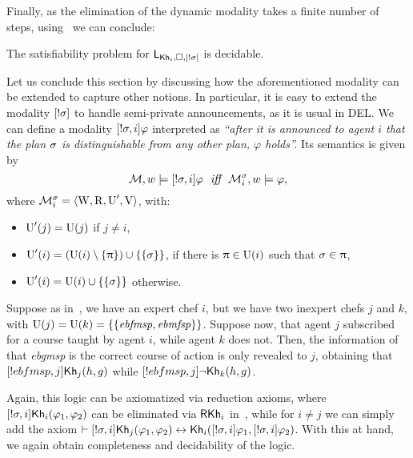 Finally, as the elimination of the dynamic modality takes a finite number of steps, using~ we can conclude:

\medskip 

\begin{corollary}
The satisfiability problem for $\mathsf{L}_{{\sf Kh}_i,\square,[!\sigma]}$ is decidable.
\end{corollary} 

\medskip 

Let us conclude this section by discussing how the aforementioned modality can be extended to capture other notions. In particular, it is easy to extend the modality $[!\sigma]$ to handle semi-private announcements, as it is usual in DEL. We can define a modality  $[!\sigma,i]\varphi$ interpreted as \emph{``after it is announced to agent $i$ that the plan $\sigma$ is distinguishable from any other plan, $\varphi$ holds''.} Its semantics is given by 
\[
    \modults,w \models \srefbox{\plan,i}\varphi \ \ \iff \ \ \modults^\plan_i,w \models \varphi,
\]
where $\mathcal{M}^\sigma_i = \langle \operatorname{W},\operatorname{R},\operatorname{U}',\operatorname{V} \rangle$, with:
\begin{itemize}
\item $\operatorname{U}'(j) = \operatorname{U}(j)$ if $j \neq i$,
\item $\operatorname{U}'(i) = (\operatorname{U}(i) \setminus \{ \uppi \}) \cup \{ \{ \sigma \} \}$, if there is $\uppi \in \operatorname{U}(i)$ such that $\sigma \in \uppi$,
\item $\operatorname{U}'(i) = \operatorname{U}(i) \cup \{ \{ \sigma \} \}$ otherwise.
\end{itemize}   

\medskip 

\begin{example}
Suppose as in~, we have an expert chef $i$, but we have two inexpert chefs $j$ and $k$, with $\operatorname{U}(j)=\operatorname{U}(k)=\{ \{ \mathit{ebfmsp},\mathit{ebmfsp} \} \}$. Suppose now, that agent $j$ subscribed for a course taught by agent $i$, while agent $k$ does not. Then, the information of that \textit{ebgmsp} is the correct course of action is only revealed to $j$, obtaining that $[!ebfmsp,j]{\sf Kh}_j(h,g)$ while $[!ebfmsp,j]\neg{\sf Kh}_k(h,g)$.
\end{example}

Again, this logic can be axiomatized via reduction axioms, where $[!\sigma,i]{\sf Kh}_i(\varphi_1,\varphi_2)$ can be eliminated via $\textsf{RKh}_i$ in~, while for $i\neq j$ we can simply add the axiom $\vdash [!\sigma,i] {\sf Kh}_j(\varphi_1,\varphi_2) \leftrightarrow {\sf Kh}_i([!\sigma,i] \varphi_1,[!\sigma,i] \varphi_2)$. With this at hand, we again obtain completeness and decidability of the logic.